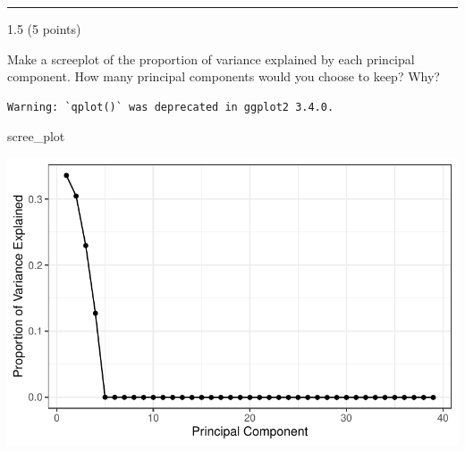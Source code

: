 \documentclass[
  letterpaper,
  DIV=11,
  numbers=noendperiod]{scrartcl}
\newenvironment{Shaded}{\begin{snugshade}}{\end{snugshade}}
\newcommand{\AttributeTok}[1]{\textcolor[rgb]{0.40,0.45,0.13}{#1}}
\newcommand{\DecValTok}[1]{\textcolor[rgb]{0.68,0.00,0.00}{#1}}
\newcommand{\FunctionTok}[1]{\textcolor[rgb]{0.28,0.35,0.67}{#1}}
\newcommand{\NormalTok}[1]{\textcolor[rgb]{0.00,0.23,0.31}{#1}}
\newcommand{\OtherTok}[1]{\textcolor[rgb]{0.00,0.23,0.31}{#1}}
\newcommand{\SpecialCharTok}[1]{\textcolor[rgb]{0.37,0.37,0.37}{#1}}
\newcommand{\StringTok}[1]{\textcolor[rgb]{0.13,0.47,0.30}{#1}}
\begin{document}
\begin{center}\rule{0.5\linewidth}{0.5pt}\end{center}

1.5 (5 points)

Make a screeplot of the proportion of variance explained by each
principal component. How many principal components would you choose to
keep? Why?

\begin{Shaded}
\end{Shaded}

\begin{verbatim}
Warning: `qplot()` was deprecated in ggplot2 3.4.0.
\end{verbatim}

\begin{Shaded}
\begin{Highlighting}[]
\NormalTok{scree\_plot}
\end{Highlighting}
\end{Shaded}

\includegraphics{hw6_files/figure-pdf/unnamed-chunk-7-1.pdf}
\end{document}
